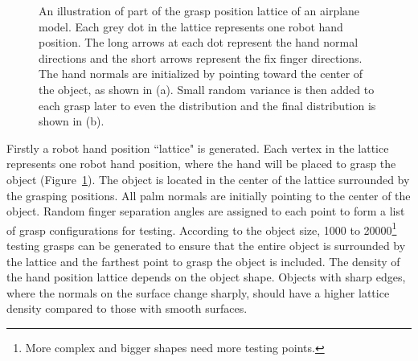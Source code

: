 \begin{figure}
  \centering
  \caption{\scriptsize{An illustration of part of the grasp position lattice of an airplane model. Each grey dot in the lattice represents one robot hand position. The long arrows at each dot represent the hand normal directions and the short arrows represent the fix finger directions. The hand normals are initialized by pointing toward the center of the object, as shown in (a). Small random variance is then added to each grasp later to even the distribution and the final distribution is shown in (b).}
}
    \label{lattice}
\end{figure}

Firstly a robot hand position ``lattice" is generated. Each vertex in the lattice represents one robot hand position, where the hand will be placed to grasp the object (Figure~\ref{lattice}). The object is located in the center of the lattice surrounded by the grasping positions. All palm normals are initially pointing to the center of the object. Random finger separation angles are assigned to each point to form a list of grasp configurations for testing. According to the object size, 1000 to 20000\footnote{More complex and bigger shapes need more testing points.} testing grasps can be generated to ensure that the entire object is surrounded by the lattice and the farthest point to grasp the object is included. The density of the hand position lattice depends on the object shape. Objects with sharp edges, where the normals on the surface change sharply, should have a higher lattice density compared to those with smooth surfaces.

